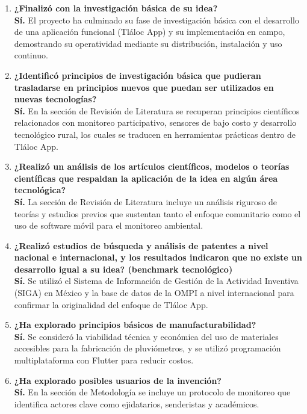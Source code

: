 \begin{enumerate}

\item \textbf{¿Finalizó con la investigación básica de su idea?} \\
\textbf{Sí.} El proyecto ha culminado su fase de investigación básica con el desarrollo de una aplicación funcional (Tláloc App) y su implementación en campo, demostrando su operatividad mediante su distribución, instalación y uso continuo.

\item \textbf{¿Identificó principios de investigación básica que pudieran trasladarse en principios nuevos que puedan ser utilizados en nuevas tecnologías?} \\
\textbf{Sí.} En la sección de Revisión de Literatura se recuperan principios científicos relacionados con monitoreo participativo, sensores de bajo costo y desarrollo tecnológico rural, los cuales se traducen en herramientas prácticas dentro de Tláloc App.

\item \textbf{¿Realizó un análisis de los artículos científicos, modelos o teorías científicas que respaldan la aplicación de la idea en algún área tecnológica?} \\
\textbf{Sí.} La sección de Revisión de Literatura incluye un análisis riguroso de teorías y estudios previos que sustentan tanto el enfoque comunitario como el uso de software móvil para el monitoreo ambiental.

\item \textbf{¿Realizó estudios de búsqueda y análisis de patentes a nivel nacional e internacional, y los resultados indicaron que no existe un desarrollo igual a su idea? (benchmark tecnológico)} \\
\textbf{Sí.} Se utilizó el Sistema de Información de Gestión de la Actividad Inventiva (SIGA) en México y la base de datos de la OMPI a nivel internacional para confirmar la originalidad del enfoque de Tláloc App.

\item \textbf{¿Ha explorado principios básicos de manufacturabilidad?} \\
\textbf{Sí.} Se consideró la viabilidad técnica y económica del uso de materiales accesibles para la fabricación de pluviómetros, y se utilizó programación multiplataforma con Flutter para reducir costos.

\item \textbf{¿Ha explorado posibles usuarios de la invención?} \\
\textbf{Sí.} En la sección de Metodología se incluye un protocolo de monitoreo que identifica actores clave como ejidatarios, senderistas y académicos.


\end{enumerate}
